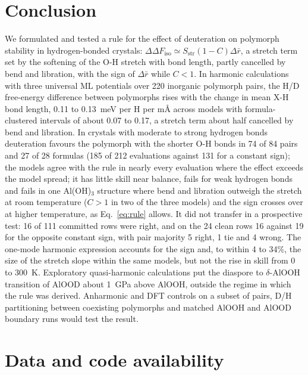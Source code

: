 \documentclass[aps,prmaterials,reprint,superscriptaddress,nofootinbib]{revtex4-2}
\newcommand{\ddF}{\Delta\Delta F_{\mathrm{iso}}}
\begin{document}
\section{Conclusion}
\label{sec:conclusion}

We formulated and tested a rule for the effect of deuteration on polymorph stability in hydrogen-bonded crystals: $\ddF \simeq S_{\mathrm{str}}(1-C)\Delta\bar r$, a stretch term set by the softening of the O-H stretch with bond length, partly cancelled by bend and libration, with the sign of $\Delta\bar r$ while $C<1$. In harmonic calculations with three universal ML potentials over 220 inorganic polymorph pairs, the H/D free-energy difference between polymorphs rises with the change in mean X-H bond length, 0.11 to 0.13~meV per H per m\AA{} across models with formula-clustered intervals of about 0.07 to 0.17, a stretch term about half cancelled by bend and libration. In crystals with moderate to strong hydrogen bonds deuteration favours the polymorph with the shorter O-H bonds in 74 of 84 pairs and 27 of 28 formulas (185 of 212 evaluations against 131 for a constant sign); the models agree with the rule in nearly every evaluation where the effect exceeds the model spread; it has little skill near balance, fails for weak hydrogen bonds and fails in one Al(OH)$_3$ structure where bend and libration outweigh the stretch at room temperature ($C>1$ in two of the three models) and the sign crosses over at higher temperature, as Eq.~\eqref{eq:rule} allows. It did not transfer in a prospective test: 16 of 111 committed rows were right, and on the 24 clean rows 16 against 19 for the opposite constant sign, with pair majority 5 right, 1 tie and 4 wrong. The one-mode harmonic expression accounts for the sign and, to within 4 to 34\%, the size of the stretch slope within the same models, but not the rise in skill from 0 to 300~K. Exploratory quasi-harmonic calculations put the diaspore to $\delta$-AlOOH transition of AlOOD about 1~GPa above AlOOH, outside the regime in which the rule was derived. Anharmonic and DFT controls on a subset of pairs, D/H partitioning between coexisting polymorphs and matched AlOOH and AlOOD boundary runs would test the result.

\section*{Data and code availability}
\end{document}
